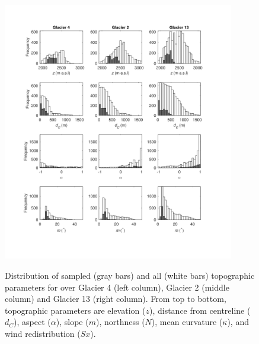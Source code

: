 \documentclass[twocolumn, letterpaper]{igs}
\begin{document}

\begin{figure}
	\centering
	\includegraphics[width =0.9\textwidth]{TopoParamsSampled1.pdf}\\
	\caption{Distribution of sampled (gray bars) and all (white bars) topographic parameters for over Glacier 4 (left column), Glacier 2 (middle column) and Glacier 13 (right column). From top to bottom, topographic parameters are elevation ($z$), distance from centreline ($d_C$), aspect ($\alpha$), slope ($m$), northness ($N$), mean curvature ($\kappa$), and wind redistribution ($Sx$).}
	\label{fig:TopoParamsSampled1}
\end{figure}
\end{document}
